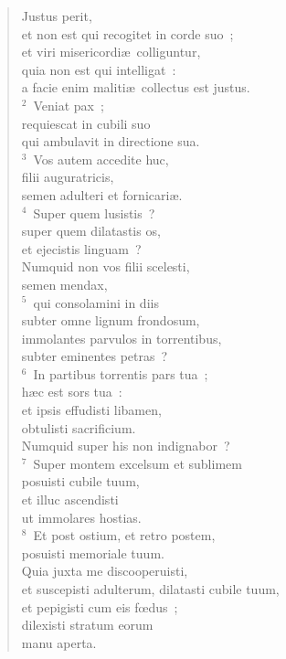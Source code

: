 \begin{flushleft}\begin{verse}\vspace{-19pt}\hspace{6pt}Justus perit,\\\hspace{6pt} et non est qui recogitet in corde suo~;\\ et viri misericordi\ae\ colliguntur,\\ quia non est qui intelligat~:\\ a facie enim maliti\ae\ collectus est justus.\\
${}^{2}$~Veniat pax~;\\ requiescat in cubili suo\\ qui ambulavit in directione sua.\\
${}^{3}$~Vos autem accedite huc,\\ filii auguratricis,\\ semen adulteri et fornicari\ae .\\
${}^{4}$~Super quem lusistis~?\\ super quem dilatastis os,\\ et ejecistis linguam~?\\ Numquid non vos filii scelesti,\\ semen mendax,\\
${}^{5}$~qui consolamini in diis\\ subter omne lignum frondosum,\\ immolantes parvulos in torrentibus,\\ subter eminentes petras~?\\
${}^{6}$~In partibus torrentis pars tua~;\\ h\ae c est sors tua~:\\ et ipsis effudisti libamen,\\ obtulisti sacrificium.\\ Numquid super his non indignabor~?\\
${}^{7}$~Super montem excelsum et sublimem\\ posuisti cubile tuum,\\ et illuc ascendisti\\ ut immolares hostias.\\
${}^{8}$~Et post ostium, et retro postem,\\ posuisti memoriale tuum.\\ Quia juxta me discooperuisti,\\ et suscepisti adulterum, dilatasti cubile tuum,\\ et pepigisti cum eis fœdus~;\\ dilexisti stratum eorum\\ manu aperta.\\

\end{verse}
\end{flushleft}
